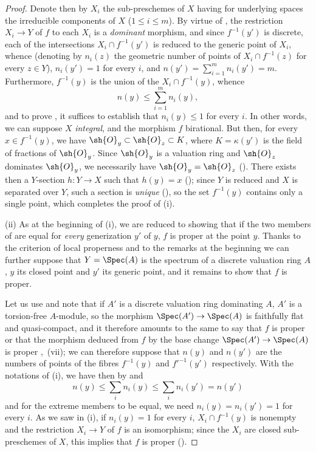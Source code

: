 \begin{proof}
Denote then by $X_i$ the sub-preschemes of $X$ having for underlying spaces the irreducible components of $X$ ($1\leq i\leq m$).
By virtue of , the restriction $X_i\to Y$ of $f$ to each $X_i$ is a \emph{dominant} morphism, and since $f^{-1}(y')$ is discrete, each of the intersections $X_i\cap f^{-1}(y')$ is reduced to the generic point of $X_i$, whence (denoting by $n_i(z)$ the geometric number of points of $X_i\cap f^{-1}(z)$ for every $z\in Y$), $n_i(y')=1$ for every $i$, and $n(y')=\sum_{i=1}^{m} n_i(y')=m$.
Furthermore, $f^{-1}(y)$ is the union of the $X_i\cap f^{-1}(y)$, whence
\begin{equation}
\tag{15.5.2.3}
\label{IV.15.5.2.3}
  n(y) \leq \sum_{i=1}^{m} n_i(y),
\end{equation}
and to prove , it suffices to establish that $n_i(y)\leq 1$ for every $i$.
In other words, we can suppose $X$ \emph{integral}, and the morphism $f$ birational.
But then, for every $x\in f^{-1}(y)$, we have $\sh{O}_y\subset\sh{O}_z\subset K$, where $K=\kappa(y')$ is the field of fractions of $\sh{O}_y$.
Since $\sh{O}_y$ is a valuation ring and $\sh{O}_z$ dominates $\sh{O}_y$, we necessarily have $\sh{O}_y=\sh{O}_z$ ().
There exists then a $Y$-section $h:Y\to X$ such that $h(y)=x$ (); since $Y$ is reduced and $X$ is separated over $Y$, such a section is \emph{unique} (), so the set $f^{-1}(y)$ contains only a single point, which completes the proof of (i).

(ii)
As at the beginning of (i), we are reduced to showing that if the two members of  are equal for \emph{every} generization $y'$ of $y$, $f$ is proper at the point $y$.
Thanks to the criterion of local properness  and to the remarks at the beginning we can further suppose that $Y=\Spec(A)$ is the spectrum of a discrete valuation ring $A$, $y$ its closed point and $y'$ its generic point, and it remains to show that $f$ is proper.

Let us use  and note that if $A'$ is a discrete valuation ring dominating $A$, $A'$ is a torsion-free $A$-module, so the morphism $\Spec(A')\to\Spec(A)$ is faithfully flat and quasi-compact, and it therefore amounts to the same to say that $f$ is proper or that the morphism deduced from $f$ by the base change $\Spec(A')\to\Spec(A)$ is
proper ,~(vii); we can therefore suppose that $n(y)$ and $n(y')$ are the numbers of points of the fibres $f^{-1}(y)$ and $f'^{-1}(y')$ respectively.
With the notations of (i), we have then by  and 
\begin{equation}
\tag{15.5.2.4}
\label{IV.15.5.2.4}
  n(y) \leq \sum_i n_i(y) \leq \sum_i n_i(y') = n(y')
\end{equation}
and for the extreme members to be equal, we need $n_i(y)=n_i(y')=1$ for every $i$.
As we saw in (i), if $n_i(y)=1$ for every $i$, $X_i\cap f^{-1}(y)$ is nonempty and the restriction $X_i\to Y$ of $f$ is an isomorphism; since the $X_i$ are closed sub-preschemes of $X$, this implies that $f$ is proper ().


\end{proof}
